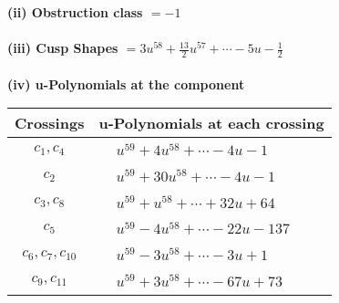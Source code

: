 \documentclass[1p]{elsarticle_modified}
\theoremstyle{definition}
\begin{document}
\flushleft \textbf{(ii) Obstruction class $= -1$}\\~\\
\flushleft \textbf{(iii) Cusp Shapes $= 3 u^{58}+\frac{13}{2} u^{57}+\cdots-5 u-\frac{1}{2}$}\\~\\
\newpage\renewcommand{\arraystretch}{1}
\flushleft \textbf{(iv) u-Polynomials at the component}\newline \\
\begin{tabular}{m{50pt}|m{274pt}}
Crossings & \hspace{64pt}u-Polynomials at each crossing \\
\hline $$\begin{aligned}c_{1},c_{4}\end{aligned}$$&$\begin{aligned}
&u^{59}+4 u^{58}+\cdots-4 u-1
\end{aligned}$\\
\hline $$\begin{aligned}c_{2}\end{aligned}$$&$\begin{aligned}
&u^{59}+30 u^{58}+\cdots-4 u-1
\end{aligned}$\\
\hline $$\begin{aligned}c_{3},c_{8}\end{aligned}$$&$\begin{aligned}
&u^{59}+u^{58}+\cdots+32 u+64
\end{aligned}$\\
\hline $$\begin{aligned}c_{5}\end{aligned}$$&$\begin{aligned}
&u^{59}-4 u^{58}+\cdots-22 u-137
\end{aligned}$\\
\hline $$\begin{aligned}c_{6},c_{7},c_{10}\end{aligned}$$&$\begin{aligned}
&u^{59}-3 u^{58}+\cdots-3 u+1
\end{aligned}$\\
\hline $$\begin{aligned}c_{9},c_{11}\end{aligned}$$&$\begin{aligned}
&u^{59}+3 u^{58}+\cdots-67 u+73
\end{aligned}$\\
\hline
\end{tabular}\\~\\
\end{document}
